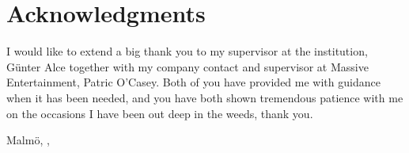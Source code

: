 \documentclass[a4paper,11pt]{article}
\begin{document}
\newpage


\section*{Acknowledgments}

I would like to extend a big thank you to my supervisor at the institution,
Günter Alce together with my company contact and supervisor at Massive
Entertainment, Patric O'Casey. Both of you have provided me with guidance when
it has been needed, and you have both shown tremendous patience with me on the
occasions I have been out deep in the weeds, thank you.

{\large

\vspace{0.7cm}
Malmö,
,
\vspace{0.7cm} \\
\name
}
\end{document}
